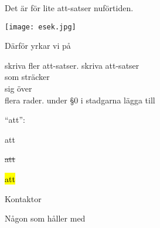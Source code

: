 \documentclass[../_main/handlingar.tex]{subfiles}
\begin{document}

Det är för lite att-satser nuförtiden.

\begin{center}
    \texttt{[image: esek.jpg]}
\end{center}

Därför yrkar vi på
\begin{attsatser}
    \att skriva fler att-satser.
    \att
    skriva att-satser\\
    som sträcker\\
    sig över\\
    flera rader.
    \att under \S0 i stadgarna lägga till\par
    \begin{itshape}
        ``att'':
        \begin{itemizedash}
            \item att
            \item \sout{att}
            \item \hl{att}
        \end{itemizedash}
    \end{itshape}
\end{attsatser}

\begin{signatures}{2}
    \mvh
    \signature{Erik Månsson}{Kontaktor}
    \signature{Måns Eriksson}{Någon som håller med}
\end{signatures}
\end{document}
